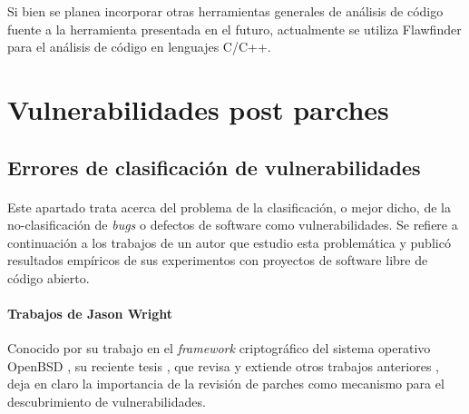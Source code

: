 \documentclass[11pt,a4paper]{article}
\begin{document}
Si bien se planea incorporar otras herramientas generales de análisis de código fuente a la herramienta presentada en el futuro, actualmente se utiliza Flawfinder \cite{Flawfinder} para el análisis de código en lenguajes C/C++.
\\

\section{Vulnerabilidades post parches}

\subsection{Errores de clasificación de vulnerabilidades}

\paragraph{}Este apartado trata acerca del problema de la clasificación, o mejor dicho, de la no-clasificación de \textit{bugs} o defectos de software como vulnerabilidades. Se refiere a continuación a los trabajos de un autor que estudio esta problemática y publicó resultados empíricos de sus experimentos con proyectos de software libre de código abierto.
\\

\paragraph{Trabajos de Jason Wright} Conocido por su trabajo en el \textit{framework} criptográfico del sistema operativo OpenBSD \cite{Jason0}, su reciente tesis \cite{Jason1}, que revisa y extiende otros trabajos anteriores \cite{Jason2, Jason3, Jason4}, deja en claro la importancia de la revisión de parches como mecanismo para el descubrimiento de vulnerabilidades.
\\
\end{document}
